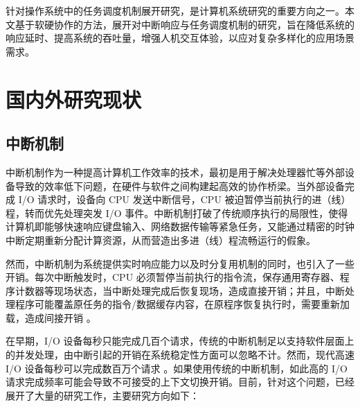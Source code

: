 针对操作系统中的任务调度机制展开研究，是计算机系统研究的重要方向之一。本文基于软硬协作的方法，展开对中断响应与任务调度机制的研究，旨在降低系统的响应延时、提高系统的吞吐量，增强人机交互体验，以应对复杂多样化的应用场景需求。

\section{国内外研究现状}

\subsection{中断机制}

中断机制作为一种提高计算机工作效率的技术，最初是用于解决处理器忙等外部设备导致的效率低下问题，在硬件与软件之间构建起高效的协作桥梁。当外部设备完成 I/O 请求时，设备向 CPU 发送中断信号，CPU 被迫暂停当前执行的进（线）程，转而优先处理突发 I/O 事件。中断机制打破了传统顺序执行的局限性，使得计算机即能够快速响应键盘输入、网络数据传输等紧急任务，又能通过精密的时钟中断定期重新分配计算资源，从而营造出多进（线）程流畅运行的假象。

然而，中断机制为系统提供实时响应能力以及时分复用机制的同时，也引入了一些开销。每次中断触发时，CPU 必须暂停当前执行的指令流，保存通用寄存器、程序计数器等现场状态，当中断处理完成后恢复现场，造成直接开销；并且，中断处理程序可能覆盖原任务的指令/数据缓存内容，在原程序恢复执行时，需要重新加载，造成间接开销 \cite{Adam2014, gruss_kaslr_2017, Livio2010, David2007, Tsafrir2007}。

在早期，I/O 设备每秒只能完成几百个请求，传统的中断机制足以支持软件层面上的并发处理，由中断引起的开销在系统稳定性方面可以忽略不计。然而，现代高速 I/O 设备每秒可以完成数百万个请求 \cite{IntelOptane, WesternDigital, InterEthernet}。如果使用传统的中断机制，如此高的 I/O 请求完成频率可能会导致不可接受的上下文切换开销。目前，针对这个问题，已经展开了大量的研究工作，主要研究方向如下：

